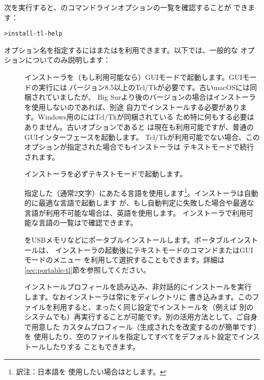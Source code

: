 \documentclass[uplatex,dvipdfmx,12pt,tombow]{jsarticle}
\begin{document}
次を実行すると、のコマンドラインオプションの一覧を確認することが
できます：
%
\begin{alltt}
> install-tl -help
\end{alltt}
%
オプション名を指定するには\sopt{}または\lopt{}を利用できます。以下では、一般的な
オプションについてのみ説明します：
%
\begin{description}
\item[]
インストーラを（もし利用可能なら）GUIモードで起動します。GUIモードの実行には
バージョン8.5以上のTcl/Tkが必要です。古いmacOSには同梱されていましたが、
Big Surより後のバージョンの場合は\MacTeX インストーラを使用しないのであれば、別途
自力でインストールする必要があります。Windows用の\TL にはTcl/Tkが同梱されている
ため特に何もする必要はありません。古いオプションであると
は現在も利用可能ですが、普通のGUIインターフェースを起動します。
Tcl/Tkが利用可能でない場合、このオプションが指定された場合でもインストーラは
テキストモードで続行されます。

\item[]
インストーラを必ずテキストモードで起動します。

\item[]
指定した（通常2文字）にあたる言語を使用します\footnote{訳注：日本語を
使用したい場合はとします。}。インストーラは自動的に最適な言語で起動します
が、もし自動判定に失敗した場合や最適な言語が利用不可能な場合は、英語を使用します。
インストーラで利用可能な言語の一覧はで確認できます。

\item[]
\TL をUSBメモリなどにポータブルインストールします。ポータブルインストールは、
インストーラの起動後にテキストモードのコマンドまたはGUIモードのメニュー
を利用して選択することもできます。詳細は\ref{sec:portable-tl}節を参照してください。

\item[]
インストールプロフィールを読み込み、非対話的にインストールを実行
します。なおインストーラは常にをディレクトリに
書き込みます。このファイルを利用すると、まったく同じ設定でインストールを（例えば
別のシステムでも）再実行することが可能です。別の活用方法として、ご自身で用意した
カスタムプロフィール（生成されたを改変するのが簡単です）を
使用したり、空のファイルを指定してすべてをデフォルト設定でインストールしたりする
こともできます。


\end{description}
\end{document}
